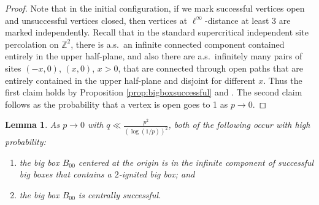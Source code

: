 \documentclass{article}
\newcommand{\bZ}{{\mathbb Z}}
\numberwithin{equation}{section}
\newtheorem{lemma}[theorem]{Lemma}
\begin{document}
\begin{proof}
Note that in the initial configuration, if we mark successful vertices open and unsuccessful vertices closed, then vertices at $\ell^\infty$-distance at least $3$ are marked independently.  Recall that in the 
    standard supercritical independent site percolation on $\bZ^2$, there is a.s.~an infinite connected component contained entirely in the upper 
    half-plane, and also there are a.s.~infinitely many pairs of sites $(-x,0)$, $(x,0)$, $x>0$, that are connected through 
    open paths that are entirely contained in the upper half-plane and disjoint for different $x$.   Thus the first claim holds by Proposition \ref{prop:bigboxsuccessful} and \cite{LiggettSchonmannStacey}. The second claim follows as the probability that a vertex is open goes to 1 as $p\to 0$.
\end{proof}

\begin{lemma}
\label{lem:spreadtoorigin}
    As $p \to 0$ with $q \ll \frac{p^2}{(\log(1/p))^2}$, both of the following occur with high probability:
    \begin{enumerate}
        \item[(i)]
        the big box $B_{00}$ centered at the origin is in the infinite component of successful big boxes that contains a $2$-ignited big box; and

        \item[(ii)]
        the big box $B_{00}$ is centrally successful.   
    \end{enumerate}
\end{lemma}
\end{document}
